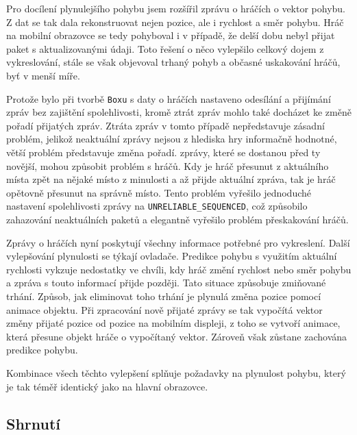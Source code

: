 \documentclass[thesis=B,czech,hidelinks]{FITthesis}[2012/06/26] %
\newcommand{\code}[1]{\texttt{#1}}
\begin{document}

Pro docílení plynulejšího pohybu jsem rozšířil zprávu o hráčích o vektor pohybu. Z dat se tak dala rekonstruovat nejen pozice, ale i rychlost a směr pohybu. Hráč na mobilní obrazovce se tedy pohyboval i v případě, že delší dobu nebyl přijat paket s aktualizovanými údaji. Toto řešení o něco vylepšilo celkový dojem z vykreslování, stále se však objevoval trhaný pohyb a občasné uskakování hráčů, byť v menší míře.


Protože bylo při tvorbě \code{Boxu} s daty o hráčích nastaveno odesílání a přijímání zpráv bez zajištění spolehlivosti, kromě ztrát zpráv mohlo také docházet ke změně pořadí přijatých zpráv. Ztráta zpráv v tomto případě nepředstavuje zásadní problém, jelikož neaktuální zprávy nejsou z hlediska hry informačně hodnotné, větší problém představuje změna pořadí.  zprávy, které se dostanou před ty novější, mohou způsobit problém s  hráčů. Kdy je hráč přesunut z aktuálního místa zpět na nějaké místo z minulosti a až přijde aktuální zpráva, tak je hráč opětovně přesunut na správně místo. Tento problém vyřešilo jednoduché nastavení spolehlivosti zprávy na \code{UNRELIABLE\_SEQUENCED}, což způsobilo zahazování neaktuálních paketů a elegantně vyřešilo problém přeskakování hráčů.

Zprávy o hráčích nyní poskytují všechny informace potřebné pro vykreslení. Další vylepšování plynulosti se týkají ovladače. Predikce pohybu s využitím aktuální rychlosti vykzuje nedostatky ve chvíli, kdy hráč změní rychlost nebo směr pohybu a zpráva s touto informací přijde později. Tato situace způsobuje zmiňované trhání. Způsob, jak eliminovat toho trhání je plynulá změna pozice pomocí animace objektu. Při zpracování nově přijaté zprávy se tak vypočítá vektor změny přijaté pozice od pozice na mobilním displeji, z toho se vytvoří animace, která přesune objekt hráče o vypočítaný vektor. Zároveň však zůstane zachována predikce pohybu. 


Kombinace všech těchto vylepšení splňuje požadavky na plynulost pohybu, který je tak téměř identický jako na hlavní obrazovce.

\subsection{Shrnutí}
\end{document}
